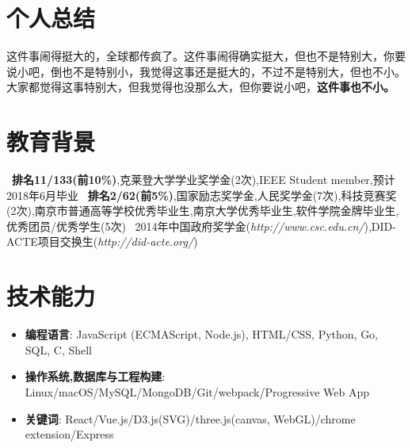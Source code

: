 \documentclass{resume_withphoto}
\begin{document}


 
\vspace{-4ex}
\vspace{-2ex}


\section{个人总结}
这件事闹得挺大的，全球都传疯了。这件事闹得确实挺大，但也不是特别大，你要说小吧，倒也不是特别小，我觉得这事还是挺大的，不过不是特别大，但也不小。大家都觉得这事特别大，但我觉得也没那么大，但你要说小吧，\textbf{这件事也不小。}

\section{教育背景}
\ \textbf{排名11/133(前10\%)},克莱登大学学业奖学金(2次),IEEE Student member,预计2018年6月毕业
\ \textbf{排名2/62(前5\%)},国家励志奖学金,人民奖学金(7次),科技竞赛奖(2次),南京市普通高等学校优秀毕业生,南京大学优秀毕业生,软件学院金牌毕业生,优秀团员/优秀学生(5次)
\ 2014年中国政府奖学金(\textit{http://www.csc.edu.cn/}),DID-ACTE项目交换生(\textit{http://did-acte.org/})

\section{技术能力}
\begin{itemize}[parsep=0.2ex]
  \item \textbf{编程语言}: JavaScript (ECMAScript, Node.js), HTML/CSS, Python, Go, SQL, C, Shell
  \item \textbf{操作系统,数据库与工程构建}: Linux/macOS/MySQL/MongoDB/Git/webpack/Progressive Web App
  \item \textbf{关键词}: React/Vue.js/D3.js(SVG)/three.js(canvas, WebGL)/chrome extension/Express
\end{itemize}
\end{document}
